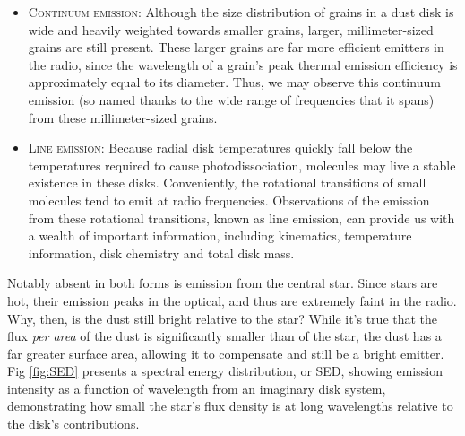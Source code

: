 \begin{itemize}


  \item \textsc{Continuum emission}: Although the size distribution of grains in a dust disk is wide and heavily weighted towards smaller grains, larger, millimeter-sized grains are still present. These larger grains are far more efficient emitters in the radio, since the wavelength of a grain's peak thermal emission efficiency is approximately equal to its diameter. Thus, we may observe this continuum emission (so named thanks to the wide range of frequencies that it spans) from these millimeter-sized grains.

  \item \textsc{Line emission}: Because radial disk temperatures quickly fall below the temperatures required to cause photodissociation, molecules may live a stable existence in these disks. Conveniently, the rotational transitions of small molecules tend to emit at radio frequencies. Observations of the emission from these rotational transitions, known as line emission, can provide us with a wealth of important information, including kinematics, temperature information, disk chemistry and total disk mass.
\end{itemize}


Notably absent in both forms is emission from the central star. Since stars are hot, their emission peaks in the optical, and thus are extremely faint in the radio. Why, then, is the dust still bright relative to the star? While it's true that the flux \textit{per area} of the dust is significantly smaller than of the star, the dust has a far greater surface area, allowing it to compensate and still be a bright emitter. Fig \ref{fig:SED} \citep{Hughes2010} presents a spectral energy distribution, or SED, showing emission intensity as a function of wavelength from an imaginary disk system, demonstrating how small the star's flux density is at long wavelengths relative to the disk's contributions.


